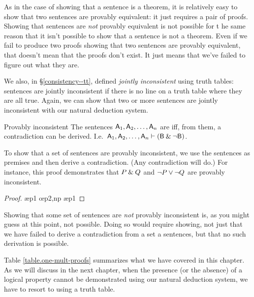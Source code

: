 As in the case of showing that a sentence is a theorem, it is relatively easy to show that two sentences are provably equivalent: it just requires a pair of proofs. Showing that sentences are \emph{not} provably equivalent is not possible for t he same reason that it isn't possible to show that a sentence is not a theorem. Even if we fail to produce two proofs showing that two sentences are provably equivalent, that doesn't mean that the proofs don't exist. It just means that we've failed to figure out what they are. 

We also, in \S\ref{consistency--tt}, defined \textit{jointly inconsistent} using truth tables: sentences are jointly inconsistent if there is no line on a truth table where they are all true. Again, we can show that two or more sentences are jointly inconsistent with our natural deduction system. 

\begin{factboxy}{Provably inconsistent}
The sentences $\mathsf{A}_1,\mathsf{A}_2,\ldots, \mathsf{A}_n$ are  iff, from them, a contradiction can be derived. I.e.\ $\mathsf{A}_1,\mathsf{A}_2,\ldots, \mathsf{A}_n \vdash (\mathsf{B} \mathbin{\&} {\neg} \mathsf{B})$.
\end{factboxy}
        
To show that a set of sentences are provably inconsistent, we use the sentences as premises and then derive a contradiction. (Any contradiction will do.) For instance, this proof demonstrates that $P \mathbin{\&} Q$ and ${\neg} P \vee {\neg} Q$ are provably inconsistent.

	\begin{proof}
	 \pr{}
	 \pr{}
	 \ae{p1}
	 
	 \oe{p2,np}
	 \ae{p1}
	\end{proof}

Showing that some set of sentences are \textit{not} provably inconsistent is, as you might guess at this point, not possible. Doing so would require showing, not just that we have failed to derive a contradiction from a set a sentences, but that no such derivation is possible.

Table \ref{table.one-mult-proofs} summarizes what we have covered in this chapter. As we will discuss in the next chapter, when the presence (or the absence) of a logical property cannot be demonstrated using our natural deduction system, we have to resort to using a truth table.

